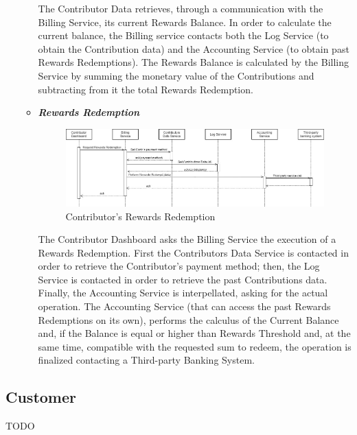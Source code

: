 \begin{itemize}
\begin{itemize}
        The Contributor Data retrieves, through a communication with the Billing Service, its current Rewards Balance. In order to calculate the current balance, the Billing service contacts both the Log Service (to obtain the Contribution data) and the Accounting Service (to obtain past Rewards Redemptions). The Rewards Balance is calculated by the Billing Service by summing the monetary value of the Contributions and subtracting from it the total Rewards Redemption. 

        \item \textbf{\textit{Rewards Redemption}}\\
        \begin{figure}[!ht]
            \centering
            \includegraphics[width=\linewidth]{document/chapters/chapter_6/images/use_cases_satisfaction_rewards_redemption.jpg}
            \caption{Contributor's Rewards Redemption}
            \label{fig:use_cases_satisfaction_rewards_redemption}
        \end{figure}

        The Contributor Dashboard asks the Billing Service the execution of a Rewards Redemption. First the Contributors Data Service is contacted in order to retrieve the Contributor's payment method; then, the Log Service is contacted in order to retrieve the past Contributions data. Finally, the Accounting Service is interpellated, asking for the actual operation. The Accounting Service (that can access the past Rewards Redemptions on its own), performs the calculus of the Current Balance and, if the Balance is equal or higher than Rewards Threshold and, at the same time, compatible with the requested sum to redeem, the operation is finalized contacting a Third-party Banking System.

    \end{itemize}
\end{itemize}

\subsection{Customer}
TODO

